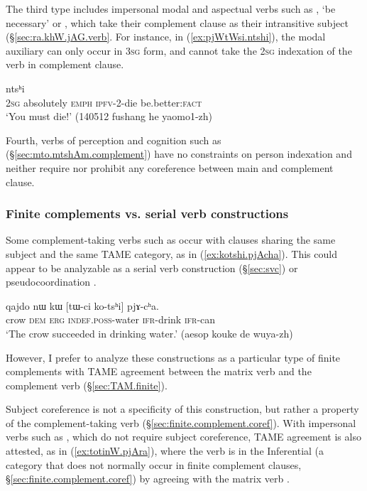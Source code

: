  The third type includes impersonal modal and aspectual verbs such as , `be necessary' or , which take their complement clause as their intransitive subject (§\ref{sec:ra.khW.jAG.verb}. For instance, in (\ref{ex:pjWtWsi.ntshi}), the modal auxiliary  can only occur in \textsc{3sg} form, and cannot take the \textsc{2sg} indexation of the verb in complement clause.
 
 \begin{exe}
\ex \label{ex:pjWtWsi.ntshi}
  ntsʰi\\
 \textsc{2sg} absolutely \textsc{emph} \textsc{ipfv}-2-die be.better:\textsc{fact} \\
 \glt `You must die!' (140512 fushang he yaomo1-zh)
 \end{exe} 
 
 Fourth, verbs of perception and cognition such as  (§\ref{sec:mto.mtshAm.complement}) have no constraints on person indexation and neither require nor prohibit any coreference between main and complement clause.

\subsubsection{Finite complements vs. serial verb constructions} \label{sec:svc.finite.agreement}
Some com\-ple\-ment-taking verbs such as  occur with clauses sharing the same subject and the same TAME category, as in (\ref{ex:kotshi.pjAcha}). This could appear to be analyzable as a serial verb construction (§\ref{sec:svc}) or pseudocoordination \citep{loedrup14agree}.

\begin{exe}
\ex   \label{ex:kotshi.pjAcha}
\gll qajdo nɯ kɯ [tɯ-ci ko-tsʰi] pjɤ-cʰa. \\
crow \textsc{dem} \textsc{erg} \textsc{indef}.\textsc{poss}-water \textsc{ifr}-drink \textsc{ifr}-can \\
\glt `The crow succeeded in drinking water.' (aesop kouke de wuya-zh)
\end{exe}

However, I prefer to analyze these constructions as a particular type of finite complements with TAME agreement between the matrix verb and the complement verb (§\ref{sec:TAM.finite}). 

Subject coreference is not a specificity of this construction, but rather a property of the com\-ple\-ment-taking verb (§\ref{sec:finite.complement.coref}). With impersonal verbs such as , which do not require subject coreference, TAME agreement is also attested, as in (\ref{ex:totinW.pjAra}), where the verb  is in the Inferential (a category that does not normally occur in finite complement clauses, §\ref{sec:finite.complement.coref}) by agreeing with the matrix verb . 

